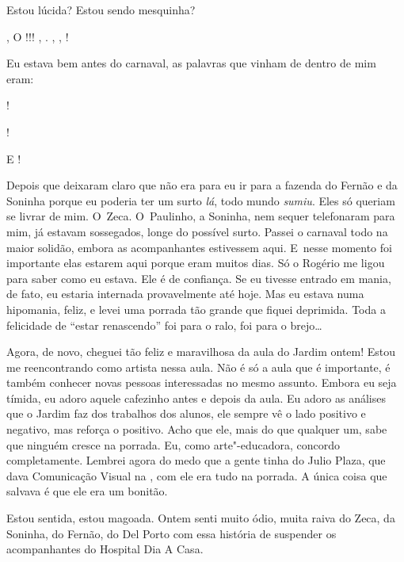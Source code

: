 Estou lúcida? Estou sendo mesquinha?

  ,   O  !!!  , 
. , , !

Eu estava bem antes do carnaval, as palavras que vinham de dentro de mim
eram:

!

 !

            E 
  !

Depois que deixaram claro que não era para eu ir para a fazenda do
Fernão e da Soninha porque eu poderia ter um surto \emph{lá}, todo mundo
\emph{sumiu}. Eles só queriam se livrar de mim. O~Zeca. O~Paulinho, a
Soninha, nem sequer telefonaram para mim, já estavam sossegados, longe
do possível surto. Passei o carnaval todo na maior solidão, embora as
acompanhantes estivessem aqui. E~nesse momento foi importante elas
estarem aqui porque eram muitos dias. Só o Rogério me ligou para saber
como eu estava. Ele é de confiança. Se eu tivesse entrado em mania, de
fato, eu estaria internada provavelmente até hoje. Mas eu estava numa
hipomania, feliz, e levei uma porrada tão grande que fiquei deprimida.
Toda a felicidade de ``estar renascendo'' foi para o ralo, foi para o
brejo…

Agora, de novo, cheguei tão feliz e maravilhosa da aula do Jardim ontem!
Estou me reencontrando como artista nessa aula. Não é só a aula que é
importante, é também conhecer novas pessoas interessadas no mesmo
assunto. Embora eu seja tímida, eu adoro aquele cafezinho antes e depois
da aula. Eu adoro as análises que o Jardim faz dos trabalhos dos alunos,
ele sempre vê o lado positivo e negativo, mas reforça o positivo. Acho
que ele, mais do que qualquer um, sabe que ninguém cresce na porrada.
Eu, como arte"-educadora, concordo completamente. Lembrei agora do medo
que a gente tinha do Julio Plaza, que dava Comunicação Visual na ,
com ele era tudo na porrada. A única coisa que salvava é que ele era um
bonitão.

Estou sentida, estou magoada. Ontem senti muito ódio, muita raiva do
Zeca, da Soninha, do Fernão, do Del Porto com essa história de suspender
os acompanhantes do Hospital Dia A Casa.

